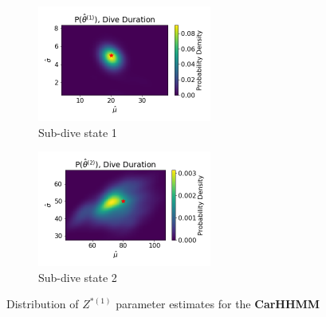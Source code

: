 \documentclass[12pt]{TD-CJS}
\begin{document}
\begin{figure}[ht]
	\centering
	\begin{subfigure}[t]{0.45\textwidth}
        \centering
        \includegraphics[width=2.25in]{../Plots/hhmm_V_MLE_density_dive_duration_-1_0.png}
        \caption{Sub-dive state 1}
    \end{subfigure}
    \begin{subfigure}[t]{0.45\textwidth}
        \centering
        \includegraphics[width=2.25in]{../Plots/hhmm_V_MLE_density_dive_duration_-1_1.png}
        \caption{Sub-dive state 2}
    \end{subfigure}
    \caption{Distribution of $Z^{*(1)}$ parameter estimates for the \textbf{CarHHMM}}
\end{figure}
\end{document}
